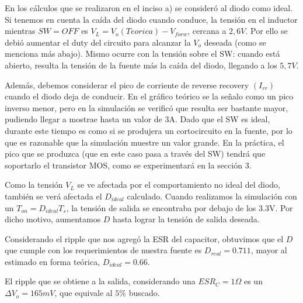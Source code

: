 \documentclass[e4_tp1_main.tex]{subfiles}
\begin{document}
En los c\'alculos que se realizaron en el inciso a) se consider\'o al diodo como ideal. Si tenemos en cuenta la ca\'ida del diodo cuando conduce, la tensi\'on en el inductor mientras $SW=OFF$ es $V_{L}=V_o(Teorica)-V_{forw}$, cercana a $2,6V$. Por ello se debió aumentar el duty del circuito para alcanzar la $V_o$ deseada (como se menciona más abajo). Mismo ocurre con la tensión sobre el SW: cuando está abierto, resulta la tensión de la fuente más la caída del diodo, llegando a los $5,7V$.\par 
Adem\'as, debemos considerar el pico de corriente de reverse recovery $(I_{rr})$ cuando el diodo deja de conducir. En el gráfico teórico se la señalo como un pico inverso menor, pero en la simulación se verificó que resulta ser bastante mayor, pudiendo llegar a mostrae hasta un valor de 3A. Dado que el SW es ideal, durante este tiempo es como si se produjera un cortocircuito en la fuente, por lo que es razonable que la simulación muestre un valor grande. En la práctica, el pico que se produzca (que en este caso pasa a través del SW) tendrá que soportarlo el transistor MOS, como se experimentará en la sección 3. 



Como la tensi\'on $V_L$ se ve afectada por el comportamiento no ideal del diodo, tambi\'en se ver\'a afectada el $D_{ideal}$ calculado.
Cuando realizamos la simulaci\'on con un $T_{on}=D_{ideal}T_s$, la tensi\'on de salida se encontraba por debajo de los 3.3V. Por dicho motivo, aumentamos $D$ hasta lograr la tensi\'on de salida deseada. 

Considerando el ripple que nos agreg\'o la ESR del capacitor, obtuvimos que el $D$ que cumple con los requerimientos de nuestra fuente es $D_{real}=0.711$, mayor al estimado en forma teórica, $D_{ideal} = 0.66$.

El ripple que se obtiene a la salida, considerando una $ESR_C=1\Omega$ es un $\Delta V_o = 165mV$, que equivale al $5\%$ buscado.






\newpage
\end{document}
